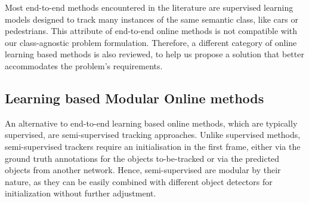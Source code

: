Most end-to-end methods encountered in the literature are supervised learning models designed to track many instances of the same semantic class, like cars or pedestrians. This attribute of end-to-end online methods is not compatible with our class-agnostic problem formulation. Therefore, a different category of online learning based methods is also reviewed, to help us propose a solution that better accommodates the problem's requirements.



\subsection{Learning based Modular Online methods}

An alternative to end-to-end learning based online methods, which are typically supervised, are semi-supervised tracking approaches. Unlike supervised methods, semi-supervised trackers require an initialisation in the first frame, either via the ground truth annotations for the objects to-be-tracked or via the predicted objects from another network. Hence, semi-supervised are modular by their nature, as they can be easily combined with different object detectors for initialization without further adjustment.  \par

